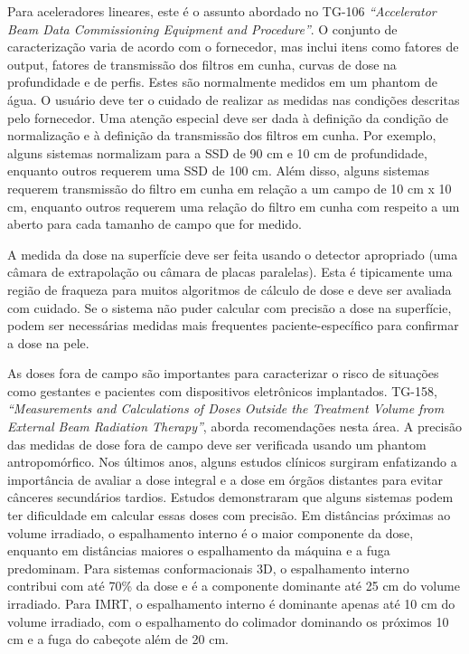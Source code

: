 \documentclass[11pt,a4paper]{article}
\newcounter{exemplo}
\begin{document}
	Para aceleradores lineares, este é o assunto abordado no TG-106 \textit{``Accelerator Beam Data Commissioning Equipment and Procedure''}. O conjunto de caracterização varia de acordo com o fornecedor, mas inclui itens como fatores de output, fatores de transmissão dos filtros em cunha, curvas de dose na profundidade e de perfis. Estes são normalmente medidos em um phantom de água. O usuário deve ter o cuidado de realizar as medidas nas condições descritas pelo fornecedor. Uma atenção especial deve ser dada à definição da condição de normalização e à definição da transmissão dos filtros em cunha. Por exemplo, alguns sistemas normalizam para a SSD de 90 cm e 10 cm de profundidade, enquanto outros requerem uma SSD de 100 cm. Além disso, alguns sistemas requerem transmissão do filtro em cunha em relação a um campo de 10 cm x 10 cm, enquanto outros requerem uma relação do filtro em cunha com respeito a um aberto para cada tamanho de campo que for medido.

	A medida da dose na superfície deve ser feita usando o detector apropriado (uma câmara de extrapolação ou câmara de placas paralelas). Esta é tipicamente uma região de fraqueza para muitos algoritmos de cálculo de dose e deve ser avaliada com cuidado. Se o sistema não puder calcular com precisão a dose na superfície, podem ser necessárias medidas mais frequentes paciente-específico para confirmar a dose na pele.

	As doses fora de campo são importantes para caracterizar o risco de situações como gestantes e pacientes com dispositivos eletrônicos implantados. TG-158, \textit{``Measurements and Calculations of Doses Outside the Treatment Volume from External Beam Radiation Therapy''}, aborda recomendações nesta área. A precisão das medidas de dose fora de campo deve ser verificada usando um phantom antropomórfico. Nos últimos anos, alguns estudos clínicos surgiram enfatizando a importância de avaliar a dose integral e a dose em órgãos distantes para evitar cânceres secundários tardios. Estudos demonstraram que alguns sistemas podem ter dificuldade em calcular essas doses com precisão. Em distâncias próximas ao volume irradiado, o espalhamento interno é o maior componente da dose, enquanto em distâncias maiores o espalhamento da máquina e a fuga predominam. Para sistemas conformacionais 3D, o espalhamento interno contribui com até 70\% da dose e é a componente dominante  até 25 cm do volume irradiado. Para IMRT, o espalhamento interno é dominante apenas até 10 cm do volume irradiado, com o espalhamento do colimador dominando os próximos 10 cm e a fuga do cabeçote além de 20 cm.
\end{document}
